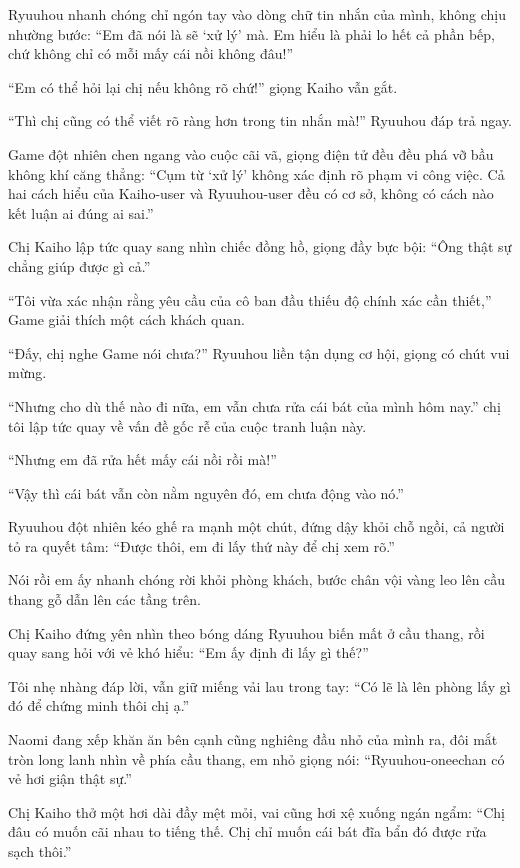 \documentclass[../main.tex]{subfiles}
\begin{document}
Ryuuhou nhanh chóng chỉ ngón tay vào dòng chữ tin nhắn của mình, không chịu nhường bước: ``Em đã nói là sẽ `xử lý' mà. Em hiểu là phải lo hết cả phần bếp, chứ không chỉ có mỗi mấy cái nồi không đâu!''

``Em có thể hỏi lại chị nếu không rõ chứ!'' giọng Kaiho vẫn gắt.

``Thì chị cũng có thể viết rõ ràng hơn trong tin nhắn mà!'' Ryuuhou đáp trả ngay.

Game đột nhiên chen ngang vào cuộc cãi vã, giọng điện tử đều đều phá vỡ bầu không khí căng thẳng: ``Cụm từ `xử lý' không xác định rõ phạm vi công việc. Cả hai cách hiểu của Kaiho-user và Ryuuhou-user đều có cơ sở, không có cách nào kết luận ai đúng ai sai.''

Chị Kaiho lập tức quay sang nhìn chiếc đồng hồ, giọng đầy bực bội: ``Ông thật sự chẳng giúp được gì cả.''

``Tôi vừa xác nhận rằng yêu cầu của cô ban đầu thiếu độ chính xác cần thiết,'' Game giải thích một cách khách quan.

``Đấy, chị nghe Game nói chưa?'' Ryuuhou liền tận dụng cơ hội, giọng có chút vui mừng.

``Nhưng cho dù thế nào đi nữa, em vẫn chưa rửa cái bát của mình hôm nay.'' chị tôi lập tức quay về vấn đề gốc rễ của cuộc tranh luận này.

``Nhưng em đã rửa hết mấy cái nồi rồi mà!''

``Vậy thì cái bát vẫn còn nằm nguyên đó, em chưa động vào nó.''

Ryuuhou đột nhiên kéo ghế ra mạnh một chút, đứng dậy khỏi chỗ ngồi, cả người tỏ ra quyết tâm: ``Được thôi, em đi lấy thứ này để chị xem rõ.''

Nói rồi em ấy nhanh chóng rời khỏi phòng khách, bước chân vội vàng leo lên cầu thang gỗ dẫn lên các tầng trên.

Chị Kaiho đứng yên nhìn theo bóng dáng Ryuuhou biến mất ở cầu thang, rồi quay sang hỏi với vẻ khó hiểu: ``Em ấy định đi lấy gì thế?''

Tôi nhẹ nhàng đáp lời, vẫn giữ miếng vải lau trong tay: ``Có lẽ là lên phòng lấy gì đó để chứng minh thôi chị ạ.''

Naomi đang xếp khăn ăn bên cạnh cũng nghiêng đầu nhỏ của mình ra, đôi mắt tròn long lanh nhìn về phía cầu thang, em nhỏ giọng nói: ``Ryuuhou-oneechan có vẻ hơi giận thật sự.''

Chị Kaiho thở một hơi dài đầy mệt mỏi, vai cũng hơi xệ xuống ngán ngẩm: ``Chị đâu có muốn cãi nhau to tiếng thế. Chị chỉ muốn cái bát đĩa bẩn đó được rửa sạch thôi.''
\end{document}
